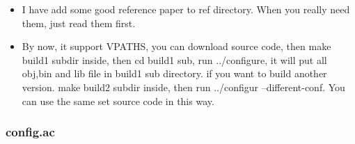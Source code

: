 \documentclass[paper=8.5in:11in, twoside, 12pt, pagesize=pdftex]{book}
\begin{document}
\begin{itemize}
\begin{enumerate}
		\end{enumerate}
			
				
		\item I have add some good reference paper to ref directory. When you really need them, just read them first. 

		\item By now, it support VPATHS, you can download source code, then make build1 subdir inside, then cd build1 sub, run ../configure, it will put all obj,bin and lib file in build1 sub directory. if you want to build another version. make build2 subdir inside, then run ../configur --different-conf. You can use the same set source code in this way. 
\end{itemize}
\subsubsection{config.ac}
\end{document}
